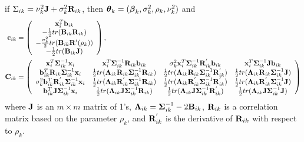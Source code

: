 \begin{theorem}
if $\Sigma_{ik}=\nu_{k}^{2}\mathbf J +\sigma_{k}^{2}\mathbf R_{ik}$, then $\boldsymbol\theta_{k}=(\boldsymbol\beta_{k},\sigma^{2}_{k},\rho_{k},\nu_{k}^{2})$ and
\begin{align*}
\mathbf c_{ik}&=\left( \begin{array}{c}\mathbf x_{i}^{T}\mathbf b_{ik}\\ -\frac{1}{2}tr( \mathbf B_{ik} \mathbf R_{ik})\\ -\frac{\sigma^{2}_{k}}{2}tr( \mathbf B_{ik} \mathbf R'(\rho_{k}))\\
-\frac{1}{2}tr( \mathbf B_{ik} \mathbf J)
\end{array}\right),\\
\mathbf C_{ik}&=\left(\begin{array}{cccc} \mathbf x_{i}^{T}\boldsymbol\Sigma_{ik}^{-1}\mathbf x_{i}& \mathbf x_{i}^{T}\boldsymbol\Sigma_{ik}^{-1}\mathbf R_{ik}\mathbf b_{ik}&\sigma^{2}_{k}\mathbf x_{i}^{T} \boldsymbol\Sigma^{-1}_{ik}\mathbf R^{'}_{ik}\mathbf b_{ik}&\mathbf x_{i}^{T} \boldsymbol\Sigma_{ik}^{-1}\mathbf J \mathbf b_{ik}\\  
\mathbf b^{T}_{ik}\mathbf R_{ik}\boldsymbol\Sigma_{ik}^{-1}\mathbf x_{i}&\frac{1}{2}tr(\boldsymbol \Lambda_{ik}\mathbf R_{ik}\boldsymbol\Sigma_{ik}^{-1}\mathbf R_{ik})&\frac{1}{2}tr(\boldsymbol \Lambda_{ik}\mathbf R_{ik}\boldsymbol\Sigma_{ik}^{-1}\mathbf R^{'}_{ik})&\frac{1}{2}tr(\boldsymbol \Lambda_{ik}\mathbf R_{ik}\boldsymbol\Sigma_{ik}^{-1}\mathbf J)\\ 
\sigma^{2}_{k}\mathbf b_{ik}^{T}\mathbf R^{'}_{ik} \boldsymbol\Sigma_{ik}^{-1}\mathbf x_{i}&\frac{1}{2}tr(\boldsymbol \Lambda_{ik}\mathbf R^{'}_{ik}\boldsymbol\Sigma_{ik}^{-1}\mathbf R_{ik})&\frac{1}{2}tr(\boldsymbol \Lambda_{ik}\mathbf R^{'}_{ik}\boldsymbol\Sigma_{ik}^{-1}\mathbf R^{'}_{ik})&\frac{1}{2}tr(\boldsymbol \Lambda_{ik}\mathbf R^{'}_{ik}\boldsymbol\Sigma_{ik}^{-1}\mathbf J)\\
 \mathbf b_{ik}^{T}\mathbf J \boldsymbol\Sigma_{ik}^{-1}\mathbf x_{i}&\frac{1}{2}tr(\boldsymbol \Lambda_{ik}\mathbf J\boldsymbol\Sigma_{ik}^{-1}\mathbf R_{ik})&\frac{1}{2}tr(\boldsymbol \Lambda_{ik}\mathbf J\boldsymbol\Sigma_{ik}^{-1}\mathbf R^{'}_{ik})&\frac{1}{2}tr(\boldsymbol \Lambda_{ik}\mathbf J\boldsymbol\Sigma_{ik}^{-1}\mathbf J)
\end{array} \right)
\end{align*}
where $\mathbf J$ is an $m\times m$ matrix of 1's, $\boldsymbol \Lambda_{ik} = \boldsymbol\Sigma_{ik}^{-1}-2\mathbf B_{ik}$, $\mathbf R_{ik}$ is a correlation matrix based on the parameter $\rho_{k}$, and $\mathbf R^{'}_{ik}$ is the derivative of $\mathbf R_{ik}$ with respect to $\rho_{k}$. 
\end{theorem}

